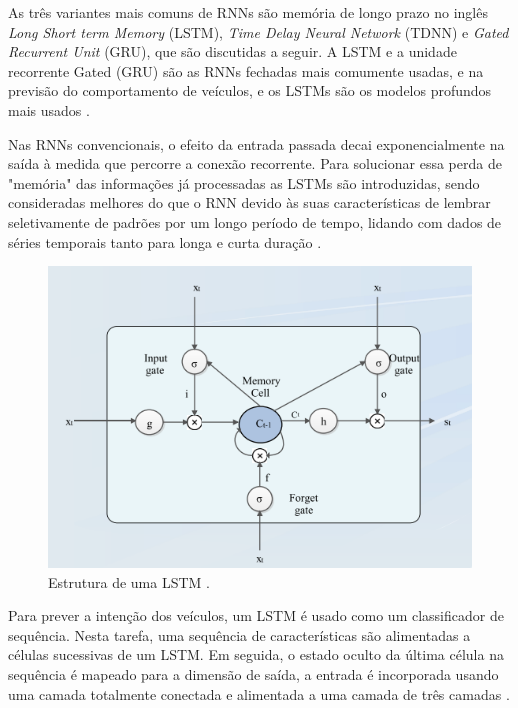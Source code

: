 As três variantes mais comuns de RNNs são memória de longo prazo no inglês \textit{Long Short term Memory} (LSTM), \textit{Time Delay Neural Network} (TDNN) e \textit{Gated Recurrent Unit} (GRU), que são discutidas a seguir.
A LSTM e a unidade recorrente Gated (GRU) são as RNNs fechadas mais comumente usadas, e na previsão do comportamento de veículos, e os LSTMs são os modelos profundos mais usados \cite{software-review}.



Nas RNNs convencionais, o efeito da entrada passada decai exponencialmente na saída à medida que percorre a conexão recorrente. Para solucionar essa perda de "memória" das informações já processadas as LSTMs são introduzidas, sendo consideradas melhores do que o RNN devido às suas características de lembrar seletivamente de padrões por um longo período de tempo, lidando com dados de séries temporais tanto para longa e curta duração \cite{software-cnn}.

\begin{figure}[H]
\centering
\includegraphics[width=\textwidth]{Figures/LSTM.png}
\caption{Estrutura de uma LSTM \cite{software-cnn}.}
\label{LSTM}
\end{figure}



Para prever a intenção dos veículos, um LSTM é usado como um classificador de sequência. Nesta tarefa, uma sequência de características são alimentadas a células sucessivas de um LSTM. Em seguida, o estado oculto da última célula na sequência é mapeado para a dimensão de saída, a entrada é incorporada usando uma camada totalmente conectada e alimentada a uma camada de três camadas \cite{software-review}.



